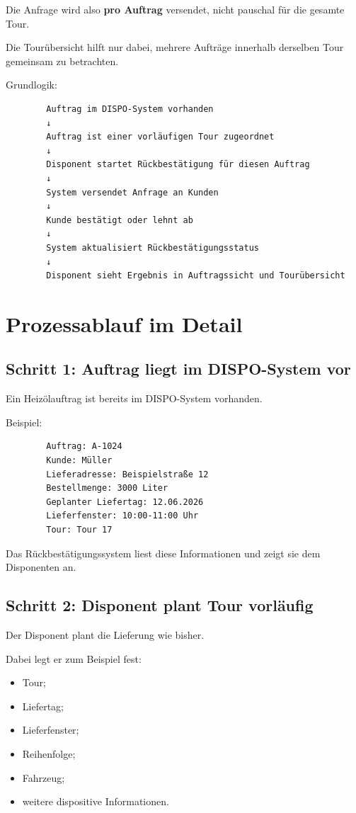 \documentclass[12pt,a4paper]{article}
\begin{document}
	Die Anfrage wird also \textbf{pro Auftrag} versendet, nicht pauschal für die gesamte Tour.
	
	Die Tourübersicht hilft nur dabei, mehrere Aufträge innerhalb derselben Tour gemeinsam zu betrachten.
	
	Grundlogik:
	
	\begin{lstlisting}
		Auftrag im DISPO-System vorhanden
		↓
		Auftrag ist einer vorläufigen Tour zugeordnet
		↓
		Disponent startet Rückbestätigung für diesen Auftrag
		↓
		System versendet Anfrage an Kunden
		↓
		Kunde bestätigt oder lehnt ab
		↓
		System aktualisiert Rückbestätigungsstatus
		↓
		Disponent sieht Ergebnis in Auftragssicht und Tourübersicht
	\end{lstlisting}
	
	\section{Prozessablauf im Detail}
	
	\subsection{Schritt 1: Auftrag liegt im DISPO-System vor}
	
	Ein Heizölauftrag ist bereits im DISPO-System vorhanden.
	
	Beispiel:
	
	\begin{lstlisting}
		Auftrag: A-1024
		Kunde: Müller
		Lieferadresse: Beispielstraße 12
		Bestellmenge: 3000 Liter
		Geplanter Liefertag: 12.06.2026
		Lieferfenster: 10:00-11:00 Uhr
		Tour: Tour 17
	\end{lstlisting}
	
	Das Rückbestätigungssystem liest diese Informationen und zeigt sie dem Disponenten an.
	
	\subsection{Schritt 2: Disponent plant Tour vorläufig}
	
	Der Disponent plant die Lieferung wie bisher.
	
	Dabei legt er zum Beispiel fest:
	
	\begin{itemize}
		\item Tour;
		\item Liefertag;
		\item Lieferfenster;
		\item Reihenfolge;
		\item Fahrzeug;
		\item weitere dispositive Informationen.
	\end{itemize}
	
\end{document}
